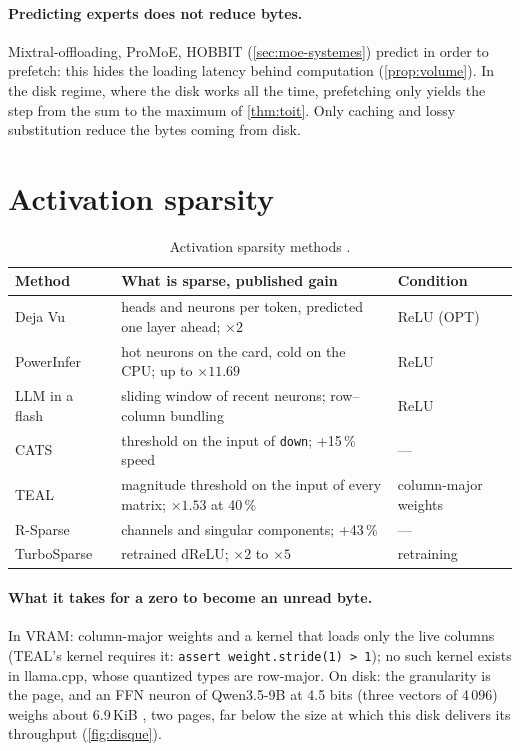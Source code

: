 \paragraph{Predicting experts does not reduce bytes.} Mixtral-offloading, ProMoE, HOBBIT (\cref{sec:moe-systemes}) predict in order to prefetch: this hides the loading latency behind computation (\cref{prop:volume}). In the disk regime, where the disk works all the time, prefetching only yields the step from the sum to the maximum of \cref{thm:toit}. Only caching and lossy substitution reduce the bytes coming from disk.

\section{Activation sparsity}\label{sec:sparsite-activations}

\begin{table}[ht]
\centering\small
\caption[Activation sparsity methods]{Activation sparsity methods \litt.}
\label{tab:sparsite}
\begin{tabularx}{\linewidth}{@{}lXl@{}}
\toprule
Method & What is sparse, published gain & Condition \\
\midrule
Deja Vu~\cite{dejavu2023} & heads and neurons per token, predicted one layer ahead; $\times2$ & ReLU (OPT) \\
PowerInfer~\cite{powerinfer2024} & hot neurons on the card, cold on the CPU; up to $\times11.69$ & ReLU \\
LLM in a flash~\cite{llminflash2024} & sliding window of recent neurons; row--column bundling & ReLU \\
CATS~\cite{cats2024} & threshold on the input of \texttt{down}; +15\,\% speed & --- \\
TEAL~\cite{teal2024} & magnitude threshold on the input of every matrix; $\times1.53$ at 40\,\% & column-major weights \\
R-Sparse~\cite{rsparse2025} & channels and singular components; +43\,\% & --- \\
TurboSparse~\cite{turbosparse2024} & retrained dReLU; $\times2$ to $\times5$ & retraining \\
\bottomrule
\end{tabularx}
\end{table}

\paragraph{What it takes for a zero to become an unread byte.} In VRAM: column-major weights and a kernel that loads only the live columns (TEAL's kernel requires it: \texttt{assert weight.stride(1) > 1}); no such kernel exists in llama.cpp, whose quantized types are row-major. On disk: the granularity is the page, and an FFN neuron of Qwen3.5-9B at 4.5 bits (three vectors of 4\,096) weighs about 6.9\,KiB \calc, two pages, far below the size at which this disk delivers its throughput (\cref{fig:disque}).

